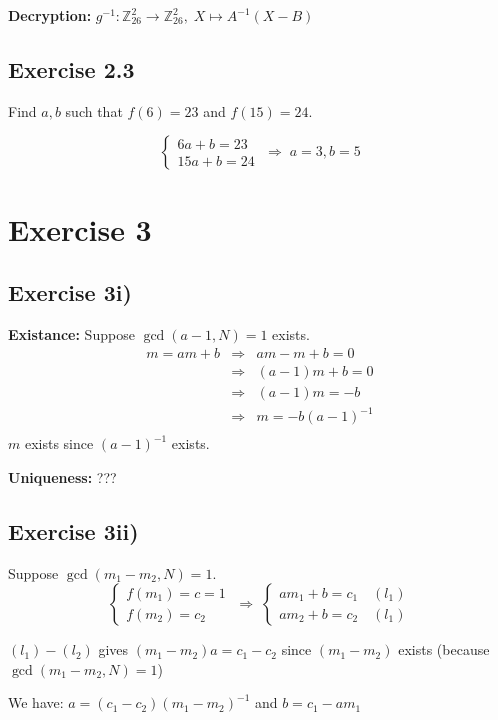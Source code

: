\documentclass[a4paper]{scrreprt}
\begin{document}
\textbf{Decryption:} $g^{-1}: \mathbb Z_{26}^2\rightarrow\mathbb Z_{26}^2,\; X\mapsto A^{-1}(X-B)$

\subsection*{Exercise 2.3}
Find $a, b$ such that $f(6) = 23$ and $f(15)=24$.

\[\left\{\begin{matrix}6a+b=23\\15a+b=24\end{matrix}\right.\;\Rightarrow\;a=3,b=5\]


\section*{Exercise 3}
\subsection*{Exercise 3i)}

\begin{samepage}
\textbf{Existance:} Suppose $\gcd(a-1, N)=1$ exists.\begin{eqnarray*}
    m = am+b &\Rightarrow& am-m+b = 0\\
    &\Rightarrow& (a-1)m+b=0\\
    &\Rightarrow& (a-1) m = -b\\
    &\Rightarrow& m = -b(a-1)^{-1}\\
\end{eqnarray*}
$m$ exists since $(a-1)^{-1}$ exists.
\end{samepage}

\textbf{Uniqueness:} ???

\subsection*{Exercise 3ii)}

Suppose $\gcd(m_1-m_2,N)=1$.
\[\left\{\begin{matrix}f(m_1)=c=1\\f(m_2)=c_2\end{matrix}\right.
    \;\Rightarrow\;\left\{\begin{matrix}am_1+b=c_1\quad (l_1)\\am_2+b=c_2\quad (l_1)\end{matrix}\right.\]

        $(l_1)-(l_2)$ gives $(m_1-m_2)a=c_1-c_2$ since $(m_1-m_2)$ exists (because $\gcd(m_1-m_2,N)=1$)

        We have: $a=(c_1-c_2)(m_1-m_2)^{-1}$ and $b=c_1-am_1$
\end{document}
